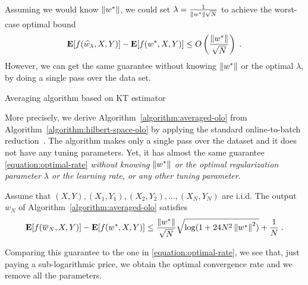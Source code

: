 Assuming we would know $\left\|{w^*}\right\|$, we could set $\lambda =
\tfrac{1}{\left\|{w^*}\right\| \sqrt{N}}$ to achieve the worst-case optimal bound
%
\begin{equation}
\label{equation:optimal-rate}
\operatorname*{\mathbf{E}}[f(\widehat{w}_\lambda,X,Y)] - \operatorname*{\mathbf{E}}[f(w^*,X,Y)] \le O\left(\frac{\left\|{w^*}\right\|}{\sqrt{N}}\right) \; .
\end{equation}
However, we can get the same guarantee without knowing $\left\|{w^*}\right\|$ or the
optimal $\lambda$, by doing a single pass over the data set.
%
\begin{algorithm}[t]
\caption{Averaging algorithm based on KT estimator \label{algorithm:averaged-olo}}
\begin{algorithmic}[1]
{
\ENDFOR
{}
}
\end{algorithmic}
\end{algorithm}
%
More precisely, we derive Algorithm~\ref{algorithm:averaged-olo} from
Algorithm~\ref{algorithm:hilbert-space-olo} by applying the standard
online-to-batch reduction~\citep{Shalev-Shwartz-2011}.  The algorithm makes only
a single pass over the dataset and it does not have any tuning parameters. Yet,
it has almost the same guarantee \eqref{equation:optimal-rate} \emph{without
knowing $\left\|{w^*}\right\|$ or the optimal regularization parameter $\lambda$ or the
learning rate, or any other tuning parameter}.

\begin{theorem}
Assume that $(X, Y), (X_1, Y_1), (X_2, Y_2), \dots, (X_N,Y_N)$ are i.i.d.  The
output $\overline{w}_N$ of Algorithm~\ref{algorithm:averaged-olo} satisfies
$$
\operatorname*{\mathbf{E}}[f(\overline{w}_N,X,Y)] - \operatorname*{\mathbf{E}}[f(w^*,X,Y)] \le \frac{\left\|{w^*}\right\|}{\sqrt{N}} \sqrt{\log(1+24 N^2 \left\|{w^*}\right\|^2)} + \frac{1}{N} \; .
$$
\end{theorem}
%
Comparing this guarantee to the one in \eqref{equation:optimal-rate}, we see
that, just paying a sub-logarithmic price, we obtain the optimal convergence
rate and we remove all the parameters.
